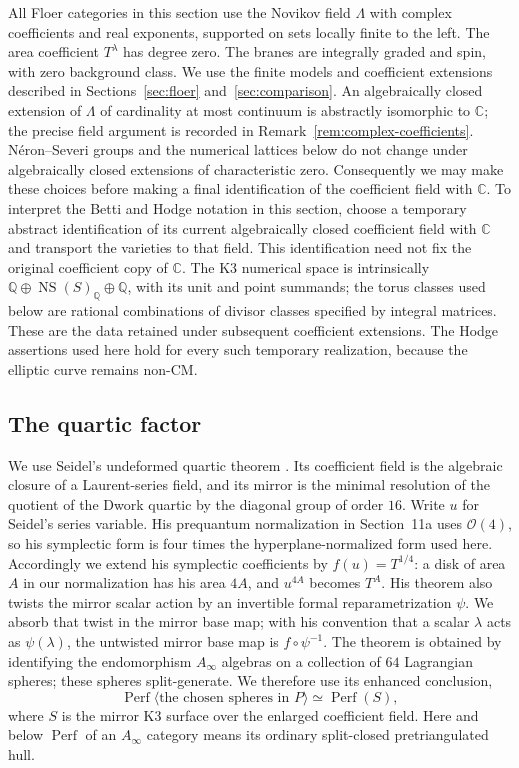 \documentclass[11pt]{article}
\numberwithin{equation}{section}
\theoremstyle{definition}
\theoremstyle{remark}
\newcommand{\Q}{\mathbb Q}
\newcommand{\C}{\mathbb C}
\newcommand{\Perf}{\operatorname{Perf}}
\newcommand{\NS}{\operatorname{NS}}
\begin{document}
All Floer categories in this section use the Novikov field $\Lambda$ with
complex coefficients and real exponents, supported on sets locally finite to
the left.  The area coefficient $T^\lambda$ has degree zero.  The branes are
integrally graded and spin, with zero background class.  We use the finite
models and coefficient extensions described in Sections~\ref{sec:floer}
and~\ref{sec:comparison}.  An algebraically closed extension of $\Lambda$ of
cardinality at most continuum is abstractly isomorphic to $\C$; the precise
field argument is recorded in Remark~\ref{rem:complex-coefficients}.  N\'eron--Severi groups
and the numerical lattices below do not change under algebraically closed
extensions of characteristic zero.  Consequently we may make these choices
before making a final identification of the coefficient field with $\C$.
To interpret the Betti and Hodge notation in this section, choose a
temporary abstract identification of its current algebraically closed
coefficient field with $\C$ and transport the varieties to that field.
This identification need not fix the original coefficient copy of
$\C$.  The K3 numerical space is intrinsically
$\Q\oplus\NS(S)_\Q\oplus\Q$, with its unit and point summands;
the torus classes used below are rational combinations of divisor
classes specified by integral matrices.  These are the data retained
under subsequent coefficient extensions.  The Hodge assertions used
here hold for every such temporary realization, because the elliptic
curve remains non-CM.

\subsection{The quartic factor}

We use Seidel's undeformed quartic theorem
\cite[Theorem~1.3]{HMS:SeidelQuartic}.  Its coefficient field is the algebraic
closure of a Laurent-series field, and its mirror is the minimal resolution
of the quotient of the Dwork quartic by the diagonal group of order $16$.
Write $u$ for Seidel's series variable.  His prequantum normalization
in Section~11a uses $\mathcal O(4)$, so his symplectic form is four
times the hyperplane-normalized form used here.  Accordingly we extend
his symplectic coefficients by $f(u)=T^{1/4}$: a disk of area $A$
in our normalization has his area $4A$, and $u^{4A}$ becomes $T^A$.
His theorem also twists the mirror scalar action by an invertible
formal reparametrization $\psi$.  We absorb that twist in the mirror
base map; with his convention that a scalar $\lambda$ acts as
$\psi(\lambda)$, the untwisted mirror base map is $f\circ\psi^{-1}$.
The theorem is obtained by identifying
the endomorphism $A_\infty$ algebras on a collection of $64$ Lagrangian spheres;
these spheres split-generate.  We therefore use its enhanced conclusion,
\begin{equation}\label{eq:quartic-hms}
 \operatorname{Perf}\langle\text{the chosen spheres in }P\rangle
 \simeq\Perf(S),
\end{equation}
where $S$ is the mirror K3 surface over the enlarged coefficient field.
Here and below $\operatorname{Perf}$ of an $A_\infty$ category means its ordinary
split-closed pretriangulated hull.
\end{document}
